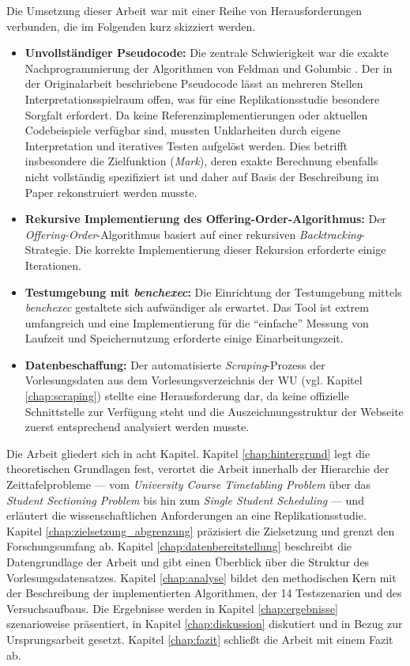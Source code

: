 Die Umsetzung dieser Arbeit war mit einer Reihe von Herausforderungen verbunden, die im Folgenden kurz skizziert werden.

\begin{itemize}
  \item \textbf{Unvollständiger Pseudocode:} Die zentrale Schwierigkeit war die exakte Nachprogrammierung der Algorithmen von Feldman und Golumbic \cite{feldmangolumbic}. Der in der Originalarbeit beschriebene Pseudocode lässt an mehreren Stellen Interpretationsspielraum offen, was für eine Replikationsstudie besondere Sorgfalt erfordert. Da keine Referenzimplementierungen oder aktuellen Codebeispiele verfügbar sind, mussten Unklarheiten durch eigene Interpretation und iteratives Testen aufgelöst werden. Dies betrifft insbesondere die Zielfunktion (\textit{Mark}), deren exakte Berechnung ebenfalls nicht vollständig spezifiziert ist und daher auf Basis der Beschreibung im Paper rekonstruiert werden musste.
  \item \textbf{Rekursive Implementierung des Offering-Order-Algorithmus:} Der \textit{Offering-Order}-Algorithmus basiert auf einer rekursiven \textit{Backtracking}-Strategie. Die korrekte Implementierung dieser Rekursion erforderte einige Iterationen.
  \item \textbf{Testumgebung mit \textit{benchexec}:} Die Einrichtung der Testumgebung mittels \textit{benchexec} \cite{benchexec} gestaltete sich aufwändiger als erwartet. Das Tool ist extrem umfangreich und eine Implementierung für die \enquote{einfache} Messung von Laufzeit und Speichernutzung erforderte einige Einarbeitungszeit.
  \item \textbf{Datenbeschaffung:} Der automatisierte \textit{Scraping}-Prozess der Vorlesungsdaten aus dem Vorlesungsverzeichnis der WU (vgl. Kapitel \ref{chap:scraping}) stellte eine Herausforderung dar, da keine offizielle Schnittstelle zur Verfügung steht und die Auszeichnungsstruktur der Webseite zuerst entsprechend analysiert werden musste.
\end{itemize}




Die Arbeit gliedert sich in acht Kapitel. Kapitel \ref{chap:hintergrund} legt die theoretischen Grundlagen fest, verortet die Arbeit innerhalb der Hierarchie der Zeittafelprobleme --- vom \textit{University Course Timetabling Problem} über das \textit{Student Sectioning Problem} bis hin zum \textit{Single Student Scheduling} --- und erläutert die wissenschaftlichen Anforderungen an eine Replikationsstudie. Kapitel \ref{chap:zielsetzung_abgrenzung} präzisiert die Zielsetzung und grenzt den Forschungsumfang ab. Kapitel \ref{chap:datenbereitstellung} beschreibt die Datengrundlage der Arbeit und gibt einen Überblick über die Struktur des Vorlesungsdatensatzes. Kapitel \ref{chap:analyse} bildet den methodischen Kern mit der Beschreibung der implementierten Algorithmen, der 14 Testszenarien und des Versuchsaufbaus. Die Ergebnisse werden in Kapitel \ref{chap:ergebnisse} szenarioweise präsentiert, in Kapitel \ref{chap:diskussion} diskutiert und in Bezug zur Ursprungsarbeit gesetzt. Kapitel \ref{chap:fazit} schließt die Arbeit mit einem Fazit ab.

